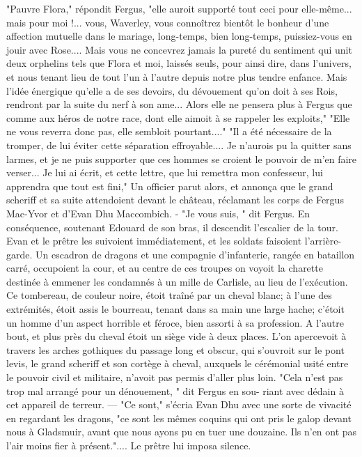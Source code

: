 "Pauvre Flora," répondit Fergus, "elle auroit supporté tout ceci pour elle-même... mais pour moi !... vous, Waverley, vous connoîtrez bientôt le bonheur d'une affection mutuelle dans le mariage, long-temps, bien long-temps, puissiez-vous en jouir avec Rose.... Mais vous ne concevrez jamais la pureté du sentiment qui unit deux orphelins tels que Flora et moi, laissés seuls, pour ainsi dire, dans l'univers, et nous tenant lieu de tout l'un à l'autre depuis notre plus tendre enfance. Mais l'idée énergique qu'elle a de ses devoirs, du dévouement qu'on doit à ses Rois, rendront par la suite du nerf à son ame... Alors elle ne pensera plus à Fergus que comme aux héros de notre race, dont elle aimoit à se rappeler les exploits,"
"Elle ne vous reverra donc pas, elle sembloit pourtant...."
"Il a été nécessaire de la tromper, de lui éviter cette séparation effroyable.... Je n'aurois pu la quitter sans larmes, et je ne puis supporter que ces hommes se croient le pouvoir de m'en faire verser... Je lui ai écrit, et cette lettre, que lui remettra mon confesseur, lui apprendra que tout est fini,"\setcounter{page}{390} Un officier parut alors, et annonça que le grand scheriff et sa suite attendoient devant le château, réclamant les corps de Fergus Mac-Yvor et d'Evan Dhu Maccombich. - "Je vous suis, " dit Fergus. En conséquence, soutenant Edouard de son bras, il descendit l'escalier de la tour. Evan et le prêtre les suivoient immédiatement, et les soldats faisoient l'arrière-garde.
Un escadron de dragons et une compagnie d'infanterie, rangée en bataillon carré, occupoient la cour, et au centre de ces troupes on voyoit la charette destinée à emmener les condamnés à un mille de Carlisle, au lieu de l'exécution. Ce tombereau, de couleur noire, étoit traîné par un cheval blanc; à l'une des extrémités, étoit assis le bourreau, tenant dans sa main une large hache; c'étoit un homme d'un aspect horrible et féroce, bien assorti à sa profession. A l'autre bout, et plus près du cheval étoit un siège vide à deux places. L'on apercevoit à travers les arches gothiques du passage long et obscur, qui s'ouvroit sur le pont levis, le grand scheriff et son cortège à cheval, auxquels le cérémonial usité entre le pouvoir civil et militaire, n'avoit pas permis d'aller plus loin. "Cela n'est pas trop mal arrangé pour un dénouement, " dit Fergus en sou-\setcounter{page}{391} riant avec dédain à cet appareil de terreur. — "Ce sont," s’écria Evan Dhu avec une sorte de vivacité en regardant les dragons, "ce sont les mêmes coquins qui ont pris le galop devant nous à Gladsmuir, avant que nous ayons pu en tuer une douzaine. Ils n’en ont pas l’air moins fier à présent.".... Le prêtre lui imposa silence.
